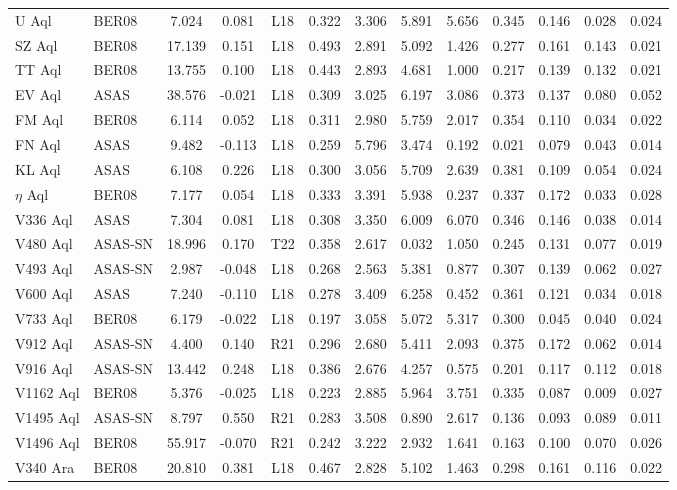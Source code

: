 \documentclass[article]{aa} %
\begin{document}
\begin{appendix}
\begin{longtable}{llSSccccccccc}
\hline \hline
\endlastfoot
U Aql & BER08 & 7.024 & 0.081&L18& 0.322&3.306&5.891 & 5.656 & 0.345 & 0.146 & 0.028&0.024\\
SZ Aql & BER08 & 17.139 & 0.151&L18& 0.493&2.891&5.092 & 1.426 & 0.277 & 0.161 & 0.143&0.021\\
TT Aql & BER08 & 13.755 & 0.100&L18& 0.443&2.893&4.681 & 1.000 & 0.217 & 0.139 & 0.132&0.021\\
EV Aql & ASAS & 38.576 & -0.021&L18& 0.309&3.025&6.197 & 3.086 & 0.373 & 0.137 & 0.080&0.052\\
FM Aql & BER08 & 6.114 & 0.052&L18& 0.311&2.980&5.759 & 2.017 & 0.354 & 0.110 & 0.034&0.022\\
FN Aql & ASAS & 9.482 & -0.113&L18& 0.259&5.796&3.474 & 0.192 & 0.021 & 0.079 & 0.043&0.014\\
KL Aql & ASAS & 6.108 & 0.226&L18& 0.300&3.056&5.709 & 2.639 & 0.381 & 0.109 & 0.054&0.024\\
$\eta$ Aql & BER08 & 7.177 & 0.054&L18& 0.333&3.391&5.938 & 0.237 & 0.337 & 0.172 & 0.033&0.028\\
V336 Aql & ASAS & 7.304 & 0.081&L18& 0.308&3.350&6.009 & 6.070 & 0.346 & 0.146 & 0.038&0.014\\
V480 Aql & ASAS-SN & 18.996 & 0.170&T22& 0.358&2.617&0.032 & 1.050 & 0.245 & 0.131 & 0.077&0.019\\
V493 Aql & ASAS-SN& 2.987 & -0.048&L18& 0.268&2.563&5.381 & 0.877 & 0.307 & 0.139 & 0.062&0.027\\
V600 Aql & ASAS & 7.240 & -0.110&L18& 0.278&3.409&6.258 & 0.452 & 0.361 & 0.121 & 0.034&0.018\\
V733 Aql & BER08 & 6.179 & -0.022&L18& 0.197&3.058&5.072 & 5.317 & 0.300 & 0.045 & 0.040&0.024\\
V912 Aql & ASAS-SN& 4.400 & 0.140&R21& 0.296&2.680&5.411 & 2.093 & 0.375 & 0.172 & 0.062&0.014\\
V916 Aql & ASAS-SN& 13.442 & 0.248&L18& 0.386&2.676&4.257 & 0.575 & 0.201 & 0.117 & 0.112&0.018\\
V1162 Aql & BER08 & 5.376 & -0.025&L18& 0.223&2.885&5.964 & 3.751 & 0.335 & 0.087 & 0.009&0.027\\
V1495 Aql & ASAS-SN& 8.797 & 0.550&R21& 0.283&3.508&0.890 & 2.617 & 0.136 & 0.093 & 0.089&0.011\\
V1496 Aql & BER08 & 55.917 & -0.070&R21& 0.242&3.222&2.932 & 1.641 & 0.163 & 0.100 & 0.070&0.026\\
V340 Ara & BER08 & 20.810 & 0.381&L18& 0.467&2.828&5.102 & 1.463 & 0.298 & 0.161 & 0.116&0.022\\

\end{longtable}
\end{appendix}
\end{document}
